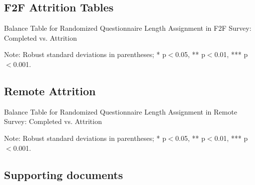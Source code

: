 \documentclass[11pt,harvard]{article}
\begin{document}
	\pagebreak
	
	\subsection{F2F Attrition Tables}
	
	\begin{table}[htbp]
		\centering
		\begin{adjustbox}{max width=\textwidth}
			\begin{threeparttable}
				\caption{Balance Table for Randomized Questionnaire Length Assignment in F2F Survey: Completed vs. Attrition}
				\small
				 
				\label{tab:BF_Listing_Demo_Attrition_F2F}
				\begin{tablenotes}
					\item Note: Robust standard deviations in parentheses; * p$<$0.05, ** p$<$0.01, *** p$<$0.001.
				\end{tablenotes}
			\end{threeparttable}
		\end{adjustbox}
	\end{table}
	
	\pagebreak
	
	\subsection{Remote Attrition}
	
	\begin{table}[htbp]
		\centering
		\begin{adjustbox}{max width=\textwidth}
			\begin{threeparttable}
				\caption{Balance Table for Randomized Questionnaire Length Assignment in Remote Survey: Completed vs. Attrition}
				\small
				 
				\label{tab:BF_Listing_Demo_Attrition_Remote}
				\begin{tablenotes}
					\item Note: Robust standard deviations in parentheses; * p$<$0.05, ** p$<$0.01, *** p$<$0.001.
				\end{tablenotes}
			\end{threeparttable}
		\end{adjustbox}
	\end{table}
	
	\pagebreak
	
	\pagebreak
	
	\subsection{Supporting documents}
\end{document}
